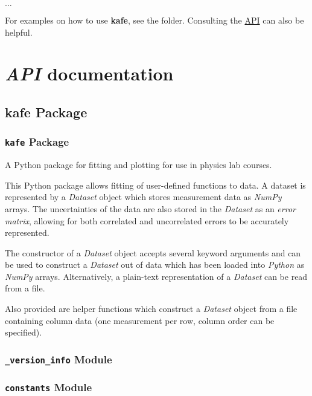 \documentclass[a4paper,10pt,english]{sphinxmanual}
\begin{document}
$\ldots$

For examples on how to use \textbf{kafe}, see the  folder. Consulting
the {\hyperref[index:api]{API}} can also be helpful.


\chapter{\emph{API} documentation}
\label{index:api-documentation}

\section{kafe Package}
\label{index:api}\label{index:kafe-package}

\subsection{\texttt{kafe} Package}
\label{index:id1}\label{index:module-kafe.__init__}
A Python package for fitting and plotting for use in physics lab courses.

This Python package allows fitting of user-defined functions to data. A dataset is
represented by a \emph{Dataset} object which stores measurement data as \emph{NumPy} arrays.
The uncertainties of the data are also stored in the \emph{Dataset} as an \emph{error matrix},
allowing for both correlated and uncorrelated errors to be accurately represented.

The constructor of a \emph{Dataset} object accepts several keyword arguments and can be used
to construct a \emph{Dataset} out of data which has been loaded into \emph{Python} as \emph{NumPy} arrays.
Alternatively, a plain-text representation of a \emph{Dataset} can be read from a file.

Also provided are helper functions which construct a \emph{Dataset} object from a
file containing column data (one measurement per row, column order can be specified).


\subsection{\texttt{\_version\_info} Module}
\label{index:module-kafe._version_info}\label{index:version-info-module}

\subsection{\texttt{constants} Module}
\label{index:constants-module}\label{index:module-kafe.constants}\label{index:module-constants}
\end{document}
